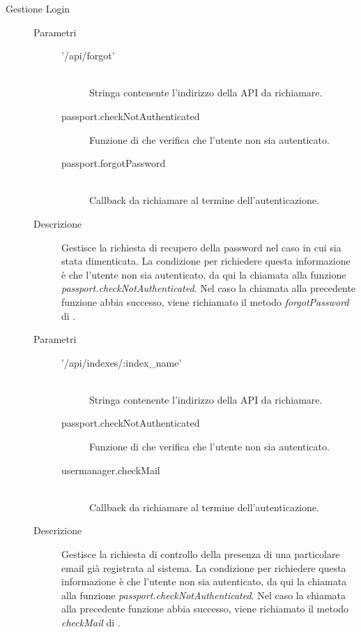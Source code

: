 \begin{description}
\begin{description}
 \item[Gestione Login]
 \begin{mldescription}
  \begin{description}
     \item[Parametri] \hfill
      \begin{description}
       \item['/api/forgot'] \hfill \\
       Stringa contenente l'indirizzo della API da richiamare.
       \item[passport.checkNotAuthenticated]
       Funzione di  che verifica che l'utente non sia autenticato.
       \item[passport.forgotPassword] \hfill \\
       Callback da richiamare al termine dell'autenticazione.
      \end{description}
     \item[Descrizione]
     Gestisce la richiesta di recupero della password nel caso in cui sia stata dimenticata. La condizione per richiedere questa informazione è che l'utente non sia autenticato, da qui la chiamata alla funzione \textit{passport.checkNotAuthenticated}. Nel caso la chiamata alla precedente funzione abbia successo, viene richiamato il metodo \textit{forgotPassword} di .
  \end{description}
  
 \begin{description}
    \item[Parametri] \hfill
     \begin{description}
      \item['/api/indexes/:index\_name'] \hfill \\
      Stringa contenente l'indirizzo della API da richiamare.
      \item[passport.checkNotAuthenticated]
      Funzione di  che verifica che l'utente non sia autenticato.
      \item[usermanager.checkMail] \hfill \\
      Callback da richiamare al termine dell'autenticazione.
     \end{description}
    \item[Descrizione]
    Gestisce la richiesta di controllo della presenza di una particolare email già registrata al sistema. La condizione per richiedere questa informazione è che l'utente non sia autenticato, da qui la chiamata alla funzione \textit{passport.checkNotAuthenticated}. Nel caso la chiamata alla precedente funzione abbia successo, viene richiamato il metodo \textit{checkMail} di .
 \end{description}
 

\end{mldescription}
\end{description}
\end{description}
